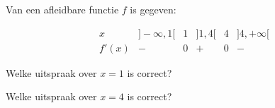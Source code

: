 \documentclass{ximera}
\begin{document}
\begin{oefening}{\oefB\ESS}

Van een afleidbare functie $f$ is gegeven:

\[
\begin{array}{c|ccccc}
x
& ]-\infty,1[
& 1
& ]1,4[
& 4
& ]4,+\infty[
\\ \hline
f'(x)
& -
& 0
& +
& 0
& -
\end{array}
\]

\begin{question}
Welke uitspraak over $x=1$ is correct?

\begin{multipleChoice}
\end{multipleChoice}
\end{question}

\begin{question}
Welke uitspraak over $x=4$ is correct?

\begin{multipleChoice}
\end{multipleChoice}
\end{question}

\end{oefening}
\end{document}
